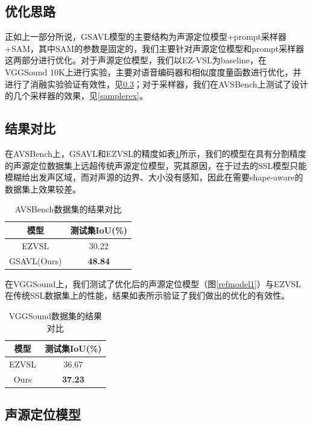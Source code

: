 \documentclass[12pt]{article}
\begin{document}
\subsection{优化思路}
正如上一部分所说，GSAVL模型的主要结构为声源定位模型+prompt采样器+SAM，其中SAM的参数是固定的，我们主要针对声源定位模型和prompt采样器这两部分进行优化。对于声源定位模型，我们以EZ-VSL为baseline，在VGGSound 10K上进行实验，主要对语音编码器和相似度度量函数进行优化，并进行了消融实验验证有效性，见\ref{vsl}；对于采样器，我们在AVSBench上测试了设计的几个采样器的效果，见\ref{samplerex}。

\subsection{结果对比}
在AVSBench上，GSAVL和EZVSL的精度如表\ref{figure:com1}所示，我们的模型在具有分割精度的声源定位数据集上远超传统声源定位模型，究其原因，在于过去的SSL模型只能模糊给出发声区域，而对声源的边界、大小没有感知，因此在需要shape-aware的数据集上效果较差。
\begin{table}[H]
    \centering
    \begin{tabular}{|c|c|}
    \hline
         模型 &  测试集IoU(\%) \\ \hline
        EZVSL &  30.22 \\ \hline
        GSAVL(Ours)&\textbf{48.84}\\\hline
    \end{tabular}
    \caption{AVSBench数据集的结果对比}
    \label{figure:com1}
\end{table}
在VGGSound上，我们测试了优化后的声源定位模型（图\ref{refmodel1}）与EZVSL在传统SSL数据集上的性能，结果如表所示验证了我们做出的优化的有效性。
\begin{table}[H]
    \centering
    \begin{tabular}{|c|c|}
    \hline
         模型 &  测试集IoU(\%) \\ \hline
        EZVSL &  36.67 \\ \hline
        Ours&\textbf{37.23}\\\hline
    \end{tabular}
    \caption{VGGSound数据集的结果对比}
    \label{figure:com2}
\end{table}
\subsection{声源定位模型}\label{vsl}
\end{document}
